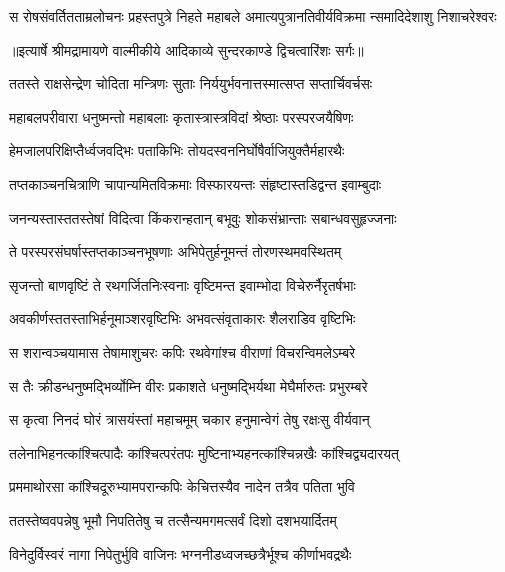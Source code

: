 \fourlineindentedshloka
{स रोषसंवर्तितताम्रलोचनः}
{ प्रहस्तपुत्रे निहते महाबले}
{अमात्यपुत्रानतिवीर्यविक्रमा}
{न्समादिदेशाशु निशाचरेश्वरः} %


{॥इत्यार्षे श्रीमद्रामायणे वाल्मीकीये आदिकाव्ये सुन्दरकाण्डे द्विचत्वारिंशः सर्गः॥}


\twolineshloka
{ततस्ते राक्षसेन्द्रेण चोदिता मन्त्रिणः सुताः}
{निर्ययुर्भवनात्तस्मात्सप्त सप्तार्चिवर्चसः} %

\twolineshloka
{महाबलपरीवारा धनुष्मन्तो महाबलाः}
{कृतास्त्रास्त्रविदां श्रेष्ठाः परस्परजयैषिणः} %

\twolineshloka
{हेमजालपरिक्षिप्तैर्ध्वजवद्भिः पताकिभिः}
{तोयदस्वननिर्घोषैर्वाजियुक्तैर्महारथैः} %

\twolineshloka
{तप्तकाञ्चनचित्राणि चापान्यमितविक्रमाः}
{विस्फारयन्तः संहृष्टास्तडिद्वन्त इवाम्बुदाः} %

\twolineshloka
{जनन्यस्तास्ततस्तेषां विदित्वा किंकरान्हतान्}
{बभूवुः शोकसंभ्रान्ताः सबान्धवसुहृज्जनाः} %

\twolineshloka
{ते परस्परसंघर्षास्तप्तकाञ्चनभूषणाः}
{अभिपेतुर्हनूमन्तं तोरणस्थमवस्थितम्} %

\twolineshloka
{सृजन्तो बाणवृष्टिं ते रथगर्जितनिःस्वनाः}
{वृष्टिमन्त इवाम्भोदा विचेरुर्नैरृतर्षभाः} %

\twolineshloka
{अवकीर्णस्ततस्ताभिर्हनूमाञ्शरवृष्टिभिः}
{अभवत्संवृताकारः शैलराडिव वृष्टिभिः} %

\twolineshloka
{स शरान्वञ्चयामास तेषामाशुचरः कपिः}
{रथवेगांश्च वीराणां विचरन्विमलेऽम्बरे} %

\twolineshloka
{स तैः क्रीडन्धनुष्मद्भिर्व्योम्नि वीरः प्रकाशते}
{धनुष्मद्भिर्यथा मेघैर्मारुतः प्रभुरम्बरे} %

\twolineshloka
{स कृत्वा निनदं घोरं त्रासयंस्तां महाचमूम्}
{चकार हनुमान्वेगं तेषु रक्षःसु वीर्यवान्} %

\twolineshloka
{तलेनाभिहनत्कांश्चित्पादैः कांश्चित्परंतपः}
{मुष्टिनाभ्यहनत्कांश्चिन्नखैः कांश्चिद्व्यदारयत्} %

\twolineshloka
{प्रममाथोरसा कांश्चिदूरुभ्यामपरान्कपिः}
{केचित्तस्यैव नादेन तत्रैव पतिता भुवि} %

\twolineshloka
{ततस्तेष्ववपन्नेषु भूमौ निपतितेषु च}
{तत्सैन्यमगमत्सर्वं दिशो दशभयार्दितम्} %

\twolineshloka
{विनेदुर्विस्वरं नागा निपेतुर्भुवि वाजिनः}
{भग्ननीडध्वजच्छत्रैर्भूश्च कीर्णाभवद्रथैः} %

